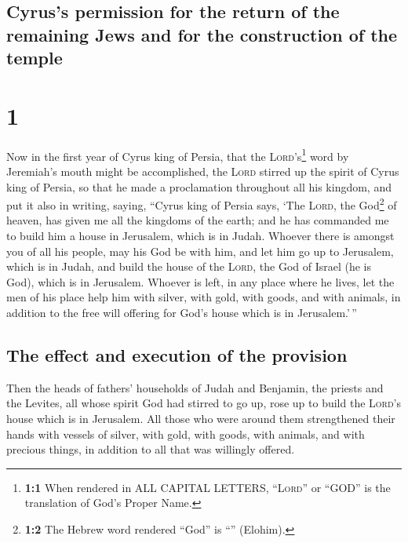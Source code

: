 \hypertarget{cyruss-permission-for-the-return-of-the-remaining-jews-and-for-the-construction-of-the-temple}{%
\subsection{Cyrus's permission for the return of the remaining Jews and
for the construction of the
temple}\label{cyruss-permission-for-the-return-of-the-remaining-jews-and-for-the-construction-of-the-temple}}

\hypertarget{section}{%
\section{1}\label{section}}

 Now in the first year of Cyrus king of Persia, that the
\textsc{Lord}'s\footnote{\textbf{1:1} When rendered in ALL CAPITAL
  LETTERS, ``\textsc{Lord}'' or ``GOD'' is the translation of God's
  Proper Name.} word by Jeremiah's mouth might be accomplished, the
\textsc{Lord} stirred up the spirit of Cyrus king of Persia, so that he
made a proclamation throughout all his kingdom, and put it also in
writing, saying,  ``Cyrus king of Persia says, `The
\textsc{Lord}, the God\footnote{\textbf{1:2} The Hebrew word rendered
  ``God'' is ``'' (Elohim).} of heaven, has given me all
the kingdoms of the earth; and he has commanded me to build him a house
in Jerusalem, which is in Judah.  Whoever there is amongst
you of all his people, may his God be with him, and let him go up to
Jerusalem, which is in Judah, and build the house of the \textsc{Lord},
the God of Israel (he is God), which is in Jerusalem. 
Whoever is left, in any place where he lives, let the men of his place
help him with silver, with gold, with goods, and with animals, in
addition to the free will offering for God's house which is in
Jerusalem.'\,''

\hypertarget{the-effect-and-execution-of-the-provision}{%
\subsection{The effect and execution of the
provision}\label{the-effect-and-execution-of-the-provision}}

 Then the heads of fathers' households of Judah and
Benjamin, the priests and the Levites, all whose spirit God had stirred
to go up, rose up to build the \textsc{Lord}'s house which is in
Jerusalem.  All those who were around them strengthened
their hands with vessels of silver, with gold, with goods, with animals,
and with precious things, in addition to all that was willingly offered.

